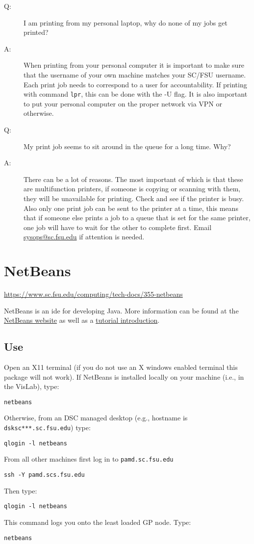 \documentclass[12pt,a4paper]{article}
\begin{document}
\begin{description}
    \item[Q:] I am printing from my personal laptop, why do none of my jobs get printed?
    \item[A:] When printing from your personal computer it is important to make sure that the username of your own machine matches your SC/FSU username. Each print job needs to correspond to a user for accountability. If printing with command \texttt{lpr}, this can be done with the -U flag. It is also important to put your personal computer on the proper network via VPN or otherwise.
    
    \item[Q:] My print job seems to sit around in the queue for a long time. Why?
    \item[A:] There can be a lot of reasons. The most important of which is that these are multifunction printers, if someone is copying or scanning with them, they will be unavailable for printing. Check and see if the printer is busy. Also only one print job can be sent to the printer at a time, this means that if someone else prints a job to a queue that is set for the same printer, one job will have to wait for the other to complete first. Email \href{mailto:sysops@sc.fsu.edu}{sysops@sc.fsu.edu} if attention is needed.
\end{description}

\section{NetBeans}
\url{https://www.sc.fsu.edu/computing/tech-docs/355-netbeans}

NetBeans is an ide for developing Java. More information can be found at the \href{https://netbeans.apache.org/}{NetBeans website} as well as a \href{https://netbeans.apache.org/kb/docs/java/quickstart.html}{tutorial introduction}.

\subsection*{Use}
Open an X11 terminal (if you do not use an X windows enabled terminal this package will not work).
If NetBeans is installed locally on your machine (i.e., in the VisLab), type:
\begin{verbatim}
netbeans
\end{verbatim}
Otherwise, from an DSC managed desktop (e.g., hostname is \texttt{dsksc***.sc.fsu.edu}) type:
\begin{verbatim}
qlogin -l netbeans
\end{verbatim}
From all other machines first log in to \texttt{pamd.sc.fsu.edu}
\begin{verbatim}
ssh -Y pamd.scs.fsu.edu
\end{verbatim}
Then type:
\begin{verbatim}
qlogin -l netbeans
\end{verbatim}
This command logs you onto the least loaded GP node. Type:
\begin{verbatim}
netbeans
\end{verbatim}
\end{document}
